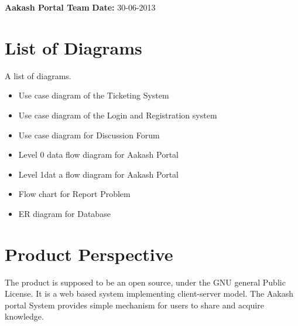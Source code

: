 \documentclass[letterpaper,10pt,english]{sphinxmanual}
\begin{document}
\textbf{Aakash Portal Team}
\textbf{Date:} 30-06-2013


\chapter{List of Diagrams}
\label{diagrams::doc}\label{diagrams:list-of-diagrams}
A list of diagrams.
\begin{itemize}
\item {} 
Use case diagram of the Ticketing System

\item {} 
Use case diagram of the Login and Registration system

\item {} 
Use case diagram for Discussion Forum

\item {} 
Level 0 data flow diagram for Aakash Portal

\item {} 
Level 1dat a flow diagram for Aakash Portal

\item {} 
Flow chart for Report Problem

\item {} 
ER diagram for Database

\end{itemize}


\chapter{Product Perspective}
\label{prodpersp::doc}\label{prodpersp:product-perspective}
The product is supposed to be an open source, under the GNU general Public License. It is a web based system implementing client-server model. The Aakash portal System provides simple mechanism for users to share and acquire knowledge.
\end{document}
